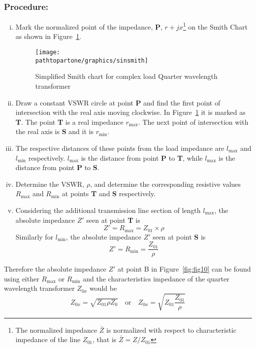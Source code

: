 \subsubsection*{Procedure:}
\begin{enumerate}[(i)]
\item Mark the normalized point of the impedance, \textbf{P}, $r + jx$\footnote{
The normalized impedance $ \bar{Z}$ is normalized with respect to characteristic impedance of the line $ Z_{01}$, that is $ \bar{Z} = Z/ Z_{01}$
} on the Smith Chart as shown in Figure~\ref{fig:sinsmith}.
\begin{figure}[h]
\centering
\texttt{[image: \\pathtopartone/graphics/sinsmith]}
\caption{ Simplified Smith chart for complex load Quarter wavelength transformer}
\label{fig:sinsmith}
\end{figure}

\item Draw a constant VSWR circle at point \textbf{P} and find the first point of intersection with the real axis moving clockwise. In Figure~\ref{fig:sinsmith} it is marked as \textbf{T}. The point \textbf{T} is a real impedance $r_\max$. The next point of intersection with the real axis is \textbf{S} and it is $r_\min$.
\item The respective distances of these points from the load impedance are $ l_\max$ and $ l_\min$ respectively. $ l_\max$ is the distance from point \textbf{P} to \textbf{T}, while $ l_\max$ is the distance from point \textbf{P} to \textbf{S}.
\item Determine the VSWR, $\rho$, and determine the corresponding resistive values $R_\max$ and $R_\min$ at points \textbf{T} and \textbf{S} respectively. 
\item Considering the additional transmission line section of length $ l_\max$, the absolute impedance $ Z'$ seen at point \textbf{T} is
\begin{equation}
Z' = R_\max = Z_{01}\times\rho
\end{equation}
Similarly for $ l_\min$, the absolute impedance $ Z'$ seen at point \textbf{S} is
\begin{equation}
Z' = R_\min = \frac{Z_{01}}{\rho}
\end{equation}
\end{enumerate}
Therefore the absolute impedance $Z'$ at point B in Figure~\ref{fig:fig10} can be found using either $ R_\max$ or $ R_\min$ and the characteristics impedance of the quarter wavelength transformer $Z_{0x}$ would be
\begin{equation*}
Z_{0x}=\sqrt{Z_{01}\rho Z_0}\quad\text{or}\quad Z_{0x}=\sqrt{Z_{01}\frac{Z_{01}}{\rho}}
\end{equation*}

